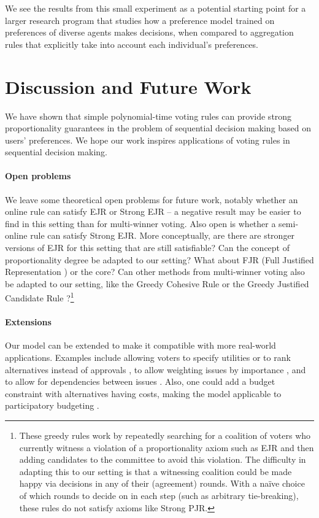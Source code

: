 \documentclass[10pt]{scrartcl}
\theoremstyle{plain}
\theoremstyle{definition}
\begin{document}
We see the results from this small experiment as a potential starting point for a larger research program that studies how a preference model trained on preferences of diverse agents makes decisions, when compared to aggregation rules that explicitly take into account each individual's preferences. \section{Discussion and Future Work}
\label{sec:conclusion}

We have shown that simple polynomial-time voting rules can provide strong proportionality guarantees in the problem of sequential decision making based on users' preferences.
We hope our work inspires applications of voting rules in sequential decision making. 




\paragraph{Open problems}
We leave some theoretical open problems for future work, notably whether an online rule can satisfy EJR or Strong EJR -- a negative result may be easier to find in this setting than for multi-winner voting. Also open is whether a semi-online rule can satisfy Strong EJR. More conceptually, are there are stronger versions of EJR for this setting that are still satisfiable? Can the concept of proportionality degree \citep{skowron2021proportionality} be adapted to our setting? What about FJR (Full Justified Representation \citep{peters2021proportional}) or the core? Can other methods from multi-winner voting also be adapted to our setting, like the Greedy Cohesive Rule \citep{peters2021proportional} or the Greedy Justified Candidate Rule \citep{ejr+}?\footnote{These greedy rules work by repeatedly searching for a coalition of voters who currently witness a violation of a proportionality axiom such as EJR and then adding candidates to the committee to avoid this violation. The difficulty in adapting this to our setting is that a witnessing coalition could be made happy via decisions in any of their (agreement) rounds. With a na\"ive choice of which rounds to decide on in each step (such as arbitrary tie-breaking), these rules do not satisfy axioms like Strong PJR.}


\paragraph{Extensions}
Our model can be extended to make it compatible with more real-world applications. Examples include allowing voters to specify utilities or to rank alternatives instead of approvals \citep{peters2021proportional}, to allow weighting issues by importance \citep{page2020electingexecutive}, and to allow for dependencies between issues \citep{propinterdependentissues}. Also, one could add a budget constraint with alternatives having costs, making the model applicable to participatory budgeting \citep{peters2021proportional}.
\end{document}
